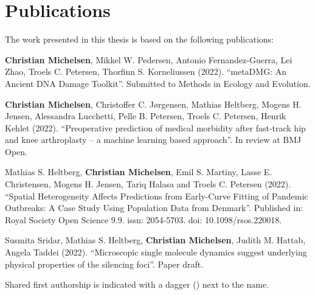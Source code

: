 \chapter{Publications}

The work presented in this thesis is based on the following publications:

\vspace{2cm}





\begin{description} [labelindent=1cm,style=multiline,leftmargin=3cm]
	\item [Paper 1:] \textbf{Christian Michelsen}\textsuperscript{\textdagger}, Mikkel W. Pedersen\textsuperscript{\textdagger}, Antonio Fernandez-Guerra, Lei Zhao, Troels C. Petersen, Thorfinn S. Korneliussen (2022). ``metaDMG: An Ancient DNA Damage Toolkit''. Submitted to Methods in Ecology and Evolution. \\
	\item [Paper 2:] \textbf{Christian Michelsen}\textsuperscript{\textdagger}, Christoffer C. Jørgensen\textsuperscript{\textdagger}, Mathias Heltberg, Mogens H. Jensen, Alessandra Lucchetti, Pelle B. Petersen, Troels C. Petersen, Henrik Kehlet (2022). ``Preoperative prediction of medical morbidity after fast-track hip and knee arthroplasty -- a machine learning based approach''. In review at BMJ Open. \\
	\item [Paper 3:] Mathias S. Heltberg\textsuperscript{\textdagger}, \textbf{Christian Michelsen}\textsuperscript{\textdagger}, Emil S. Martiny, Lasse E. Christensen, Mogens H. Jensen, Tariq Halasa and Troels C. Petersen (2022). ``Spatial Heterogeneity Affects Predictions from Early-Curve Fitting of Pandemic Outbreaks: A Case Study Using Population Data from Denmark''. Published in: Royal Society Open Science 9.9. issn: 2054-5703. doi: 10.1098/rsos.220018.  \\
	\item [Paper 4:] Susmita Sridar\textsuperscript{\textdagger}, Mathias S. Heltberg\textsuperscript{\textdagger}, \textbf{Christian Michelsen}\textsuperscript{\textdagger}, Judith M. Hattab, Angela Taddei (2022). ``Microscopic single molecule dynamics suggest underlying physical properties of the silencing foci''. Paper draft.
\end{description}


\vspace{1cm}
\noindent Shared first authorship is indicated with a dagger (\textdagger) next to the name.


